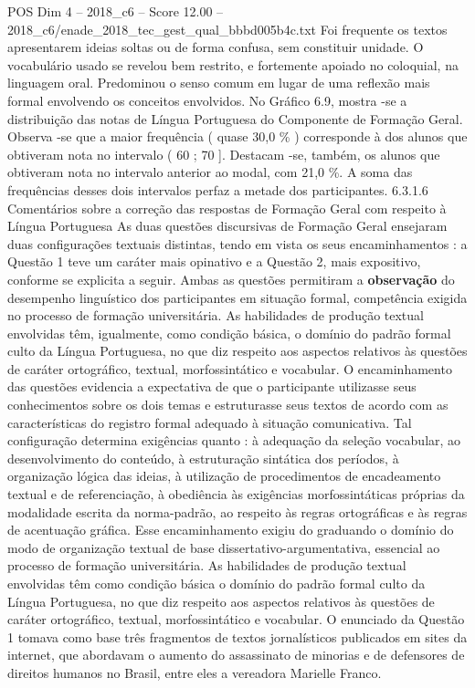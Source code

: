 \begin{textsample}{POS Dim 4 – 2018\_c6 – Score 12.00 – 2018\_c6/enade\_2018\_tec\_gest\_qual\_bbbd005b4c.txt}
Foi frequente os textos apresentarem ideias soltas ou de forma confusa, sem constituir unidade.
O vocabulário usado se revelou bem restrito, e fortemente apoiado no coloquial, na linguagem oral.
Predominou o senso comum em lugar de uma reflexão mais formal envolvendo os conceitos envolvidos.
No Gráfico 6.9, mostra -se a distribuição das notas de Língua Portuguesa do Componente de Formação Geral.
Observa -se que a maior frequência ( quase 30,0 \% ) corresponde à dos alunos que obtiveram nota no intervalo ( 60 ; 70 ].
Destacam -se, também, os alunos que obtiveram nota no intervalo anterior ao modal, com 21,0 \%.
A soma das frequências desses dois intervalos perfaz a metade dos participantes. 6.3.1.6 Comentários sobre a correção das respostas de Formação Geral com respeito à Língua Portuguesa As duas questões discursivas de Formação Geral ensejaram duas configurações textuais distintas, tendo em vista os seus encaminhamentos : a Questão 1 teve um caráter mais opinativo e a Questão 2, mais expositivo, conforme se explicita a seguir.
Ambas as questões permitiram a \textbf{observação} do desempenho linguístico dos participantes em situação formal, competência exigida no processo de formação universitária.
As habilidades de produção textual envolvidas têm, igualmente, como condição básica, o domínio do padrão formal culto da Língua Portuguesa, no que diz respeito aos aspectos relativos às questões de caráter ortográfico, textual, morfossintático e vocabular.
O encaminhamento das questões evidencia a expectativa de que o participante utilizasse seus conhecimentos sobre os dois temas e estruturasse seus textos de acordo com as características do registro formal adequado à situação comunicativa.
Tal configuração determina exigências quanto : à adequação da seleção vocabular, ao desenvolvimento do conteúdo, à estruturação sintática dos períodos, à organização lógica das ideias, à utilização de procedimentos de encadeamento textual e de referenciação, à obediência às exigências morfossintáticas próprias da modalidade escrita da norma-padrão, ao respeito às regras ortográficas e às regras de acentuação gráfica.
Esse encaminhamento exigiu do graduando o domínio do modo de organização textual de base dissertativo-argumentativa, essencial ao processo de formação universitária.
As habilidades de produção textual envolvidas têm como condição básica o domínio do padrão formal culto da Língua Portuguesa, no que diz respeito aos aspectos relativos às questões de caráter ortográfico, textual, morfossintático e vocabular.
O enunciado da Questão 1 tomava como base três fragmentos de textos jornalísticos publicados em sites da internet, que abordavam o aumento do assassinato de minorias e de defensores de direitos humanos no Brasil, entre eles a vereadora Marielle Franco.

\end{textsample}
